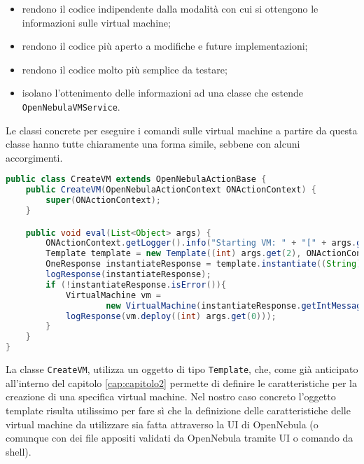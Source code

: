 \begin{itemize}
    \item rendono il codice indipendente dalla modalità con cui si ottengono le informazioni sulle virtual machine;
    \item rendono il codice più aperto a modifiche e future implementazioni;
    \item rendono il codice molto più semplice da testare;
    \item isolano l'ottenimento delle informazioni ad una classe che estende \texttt{OpenNebulaVMService}.
\end{itemize}
Le classi concrete per eseguire i comandi sulle virtual machine a partire da questa classe hanno tutte chiaramente una forma simile, sebbene con alcuni accorgimenti.
\begin{lstlisting}[language=Java, caption=Classe per avviare una \texttt{VirtualMachine}, label=code:CreateVM, basicstyle=\fontsize{8.5}{9.5}\ttfamily]
public class CreateVM extends OpenNebulaActionBase {
	public CreateVM(OpenNebulaActionContext ONActionContext) {
		super(ONActionContext);
	}

	public void eval(List<Object> args) {
		ONActionContext.getLogger().info("Starting VM: " + "[" + args.get(2) + ", " + args.get(1) + "]");
		Template template = new Template((int) args.get(2), ONActionContext.getClient());
		OneResponse instantiateResponse = template.instantiate((String) args.get(1));
		logResponse(instantiateResponse);
		if (!instantiateResponse.isError()){
			VirtualMachine vm = 
					new VirtualMachine(instantiateResponse.getIntMessage(), ONActionContext.getClient());
			logResponse(vm.deploy((int) args.get(0)));
		}		
	}
}
\end{lstlisting}
La classe \texttt{CreateVM}, utilizza un oggetto di tipo \texttt{Template}, che, come già anticipato all'interno del capitolo \ref{cap:capitolo2} permette di definire le caratteristiche per la creazione di una specifica virtual machine. Nel nostro caso concreto l'oggetto template risulta utilissimo per fare sì che la definizione delle caratteristiche delle virtual machine da utilizzare sia fatta attraverso la UI di OpenNebula (o comunque con dei file appositi validati da OpenNebula tramite UI o comando da shell).\par

